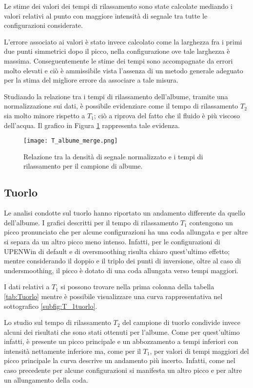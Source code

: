 Le stime dei valori dei tempi di rilassamento sono state calcolate mediando i valori relativi al punto con maggiore intensità di segnale tra tutte le configurazioni considerate.

L'errore associato ai valori è stato invece calcolato come la larghezza fra i primi due punti simmetrici dopo il picco, nella configurazione ove tale larghezza è massima.
Conseguentemente le stime dei tempi sono accompagnate da errori molto elevati e ciò è ammissibile vista l'assenza di un metodo generale adeguato per la stima del migliore errore da associare a tale misura.

Studiando la relazione tra i tempi di rilassamento dell'albume, tramite una normalizzazione sui dati, è possibile evidenziare come il tempo di rilassamento $T_2$ sia molto minore rispetto a $T_1$;
ciò a riprova del fatto che il fluido è più viscoso dell'acqua.   
Il grafico in Figura \ref{fig:Albume} rappresenta tale evidenza.

\begin{figure}
\centering
\texttt{[image: T\_albume\_merge.png]}
\caption{Relazione tra la densità di segnale normalizzato e i tempi di rilassamento per il campione di albume.}
\label{fig:Albume}
\end{figure}

\newpage
\subsection*{Tuorlo}

Le analisi condotte sul tuorlo hanno riportato un andamento differente da quello dell'albume.
I grafici descritti per il tempo di rilassamento $T_1$ contengono un picco pronunciato che per alcune configurazioni ha una coda allungata e per altre si separa da un altro picco meno intenso.
Infatti, per le configurazioni di UPENWin di default e di oversmoothing risulta chiaro quest'ultimo effetto; mentre considerando il doppio e il triplo dei punti di inversione, oltre al caso di undersmoothing, il picco è dotato di una coda allungata verso tempi maggiori.

I dati relativi a $T_1$ si possono trovare nella prima colonna della tabella \ref{tab:Tuorlo} mentre è possibile visualizzare una curva rappresentativa nel sottografico \ref{subfig:T_1tuorlo}. 

Lo studio sul tempo di rilassamento $T_2$ del campione di tuorlo condivide invece alcuni dei risultati che sono stati ottenuti per l'albume. 
Come per quest'ultimo infatti, è presente un picco principale e un abbozzamento a tempi inferiori con intensità nettamente inferiore ma, come per il $T_1$, per valori di tempi maggiori del picco principale la curva descrive un andamento più incerto.
Infatti, come nel caso precedente per alcune configurazioni si manifesta un altro picco e per altre un allungamento della coda.

